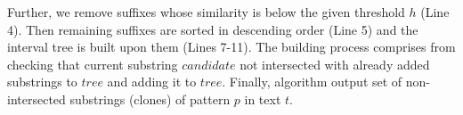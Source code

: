 Further, we remove suffixes whose similarity is below the given threshold $h$ (Line 4).
Then remaining suffixes are sorted in descending order (Line 5) and the interval tree is built upon them (Lines 7-11).
The building process comprises from checking that current substring $candidate$ not intersected with already added substrings to $tree$ and adding it to $tree$.
Finally, algorithm output set of non-intersected substrings (clones) of pattern $p$ in text $t$.




